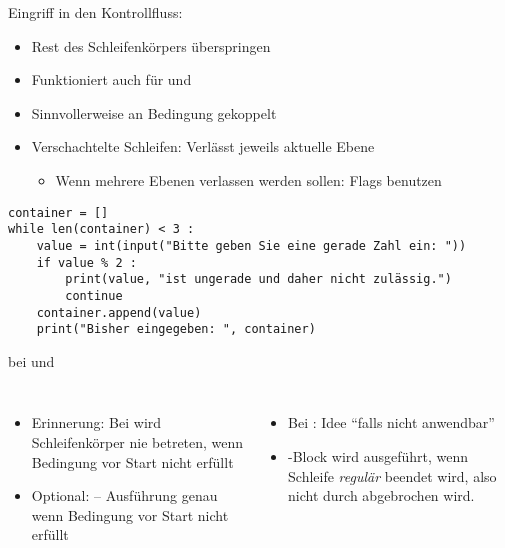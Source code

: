 
\begin{frame}[fragile]{Eingriff in den Kontrollfluss: }
%
\begin{itemize}
\item Rest des Schleifenkörpers überspringen
\item Funktioniert auch für  und 
\item Sinnvollerweise an Bedingung gekoppelt\\
 \Thus {}
\item Verschachtelte Schleifen: Verlässt jeweils aktuelle Ebene
	\begin{itemize}
	\item Wenn mehrere Ebenen verlassen werden sollen: Flags benutzen
	\end{itemize}
\end{itemize}
%
\begin{codebox}
\begin{verbatim}
container = []
while len(container) < 3 :
    value = int(input("Bitte geben Sie eine gerade Zahl ein: "))
    if value % 2 :
        print(value, "ist ungerade und daher nicht zulässig.")
        continue
    container.append(value)
    print("Bisher eingegeben: ", container)
\end{verbatim}
\end{codebox}
%
\end{frame}


\begin{frame}[fragile]{ bei  und }
%
\begin{columns}
\begin{itemize}
\item Erinnerung: Bei  wird Schleifenkörper nie betreten, wenn Bedingung vor Start nicht erfüllt
\item Optional:  -- Ausführung genau wenn Bedingung vor Start nicht erfüllt
\end{itemize}
%
\begin{itemize}
\item Bei : Idee \enquote{falls nicht anwendbar}
\item {}-Block wird ausgeführt, wenn Schleife \emph{regulär} beendet wird, also nicht durch  abgebrochen wird.
\end{itemize}
\end{columns}
%
\end{frame}

